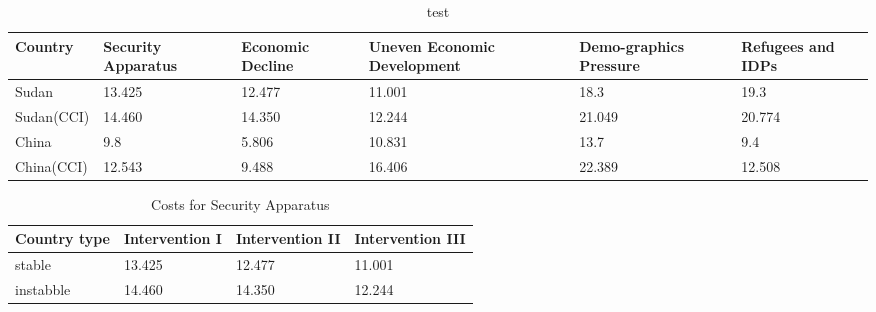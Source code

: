\begin{table}[ht]
  \caption{test}
  \label{Tab:bookRWCal}
  \centering
  \begin{tabular}{lp{1.7cm}p{1.7cm}p{1.7cm}p{1.7cm}p{1.7cm}}
  \toprule
  \textbf{Country} &\textbf{Security Apparatus} &\textbf{Economic Decline}&\textbf{Uneven Economic Development}&\textbf{Demo-graphics Pressure}&\textbf{Refugees and IDPs}\\
  \midrule
  Sudan & 13.425	&12.477	&11.001	&18.3	&19.3\\
Sudan(CCI)&	14.460	&14.350	&12.244	&21.049	&20.774\\
  \midrule
  China & 9.8 & 5.806 & 10.831 & 13.7 & 9.4\\
  China(CCI) & 12.543 &9.488&16.406 &22.389&12.508\\
  \bottomrule
  \end{tabular}
\end{table}

\begin{table}[ht]
  \caption{Costs for Security Apparatus}
  \label{tab3}
  \centering
  \begin{tabular}{p{1.7cm}p{1.7cm}p{1.7cm}p{1.7cm}}
  \toprule
  \textbf{Country type} &\textbf{Intervention I} &\textbf{Intervention II}&\textbf{Intervention III}\\
  \midrule
  stable & 13.425	&12.477	&11.001\\
  instabble &	14.460	&14.350	&12.244\\
  \bottomrule
  \end{tabular}
\end{table}
